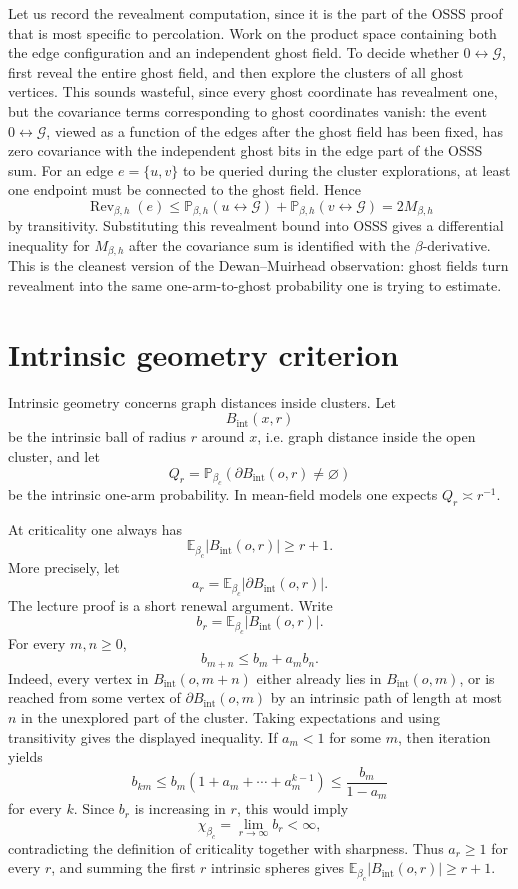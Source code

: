 \documentclass[11pt,reqno]{book}
\numberwithin{equation}{chapter}
\theoremstyle{plain}
\theoremstyle{definition}
\theoremstyle{remark}
\renewcommand{\P}{\mathbb P}
\newcommand{\E}{\mathbb E}
\newcommand{\1}{\mathbf 1}
\newcommand{\as}{\asymp}
\begin{document}
Let us record the revealment computation, since it is the part of the OSSS proof that is most specific to percolation. Work on the product space containing both the edge configuration and an independent ghost field. To decide whether \(0\leftrightarrow \mathcal G\), first reveal the entire ghost field, and then explore the clusters of all ghost vertices. This sounds wasteful, since every ghost coordinate has revealment one, but the covariance terms corresponding to ghost coordinates vanish: the event \(0\leftrightarrow \mathcal G\), viewed as a function of the edges after the ghost field has been fixed, has zero covariance with the independent ghost bits in the edge part of the OSSS sum. For an edge \(e=\{u,v\}\) to be queried during the cluster explorations, at least one endpoint must be connected to the ghost field. Hence
\[
  \operatorname{Rev}_{\beta,h}(e)
  \leq
  \P_{\beta,h}(u\leftrightarrow \mathcal G)
  +
  \P_{\beta,h}(v\leftrightarrow \mathcal G)
  =
  2M_{\beta,h}
\]
by transitivity. Substituting this revealment bound into OSSS gives a differential inequality for \(M_{\beta,h}\) after the covariance sum is identified with the \(\beta\)-derivative. This is the cleanest version of the Dewan--Muirhead observation: ghost fields turn revealment into the same one-arm-to-ghost probability one is trying to estimate.

\section{Intrinsic geometry criterion}

Intrinsic geometry concerns graph distances inside clusters. Let
\[
  B_{\mathrm{int}}(x,r)
\]
be the intrinsic ball of radius $r$ around $x$, i.e. graph distance inside the open cluster, and let
\[
  Q_r=\P_{\beta_c}(\partial B_{\mathrm{int}}(o,r)\neq\varnothing)
\]
be the intrinsic one-arm probability. In mean-field models one expects $Q_r\as r^{-1}$.

At criticality one always has
\[
  \E_{\beta_c}|B_{\mathrm{int}}(o,r)|\geq r+1.
\]
More precisely, let
\[
  a_r=\E_{\beta_c}|\partial B_{\mathrm{int}}(o,r)|.
\]
The lecture proof is a short renewal argument. Write
\[
  b_r=\E_{\beta_c}|B_{\mathrm{int}}(o,r)|.
\]
For every \(m,n\geq0\),
\[
  b_{m+n}\leq b_m+a_m b_n.
\]
Indeed, every vertex in \(B_{\mathrm{int}}(o,m+n)\) either already lies in
\(B_{\mathrm{int}}(o,m)\), or is reached from some vertex of
\(\partial B_{\mathrm{int}}(o,m)\) by an intrinsic path of length at most
\(n\) in the unexplored part of the cluster. Taking expectations and using
transitivity gives the displayed inequality. If \(a_m<1\) for some \(m\),
then iteration yields
\[
  b_{km}\leq b_m(1+a_m+\cdots+a_m^{k-1})
  \leq \frac{b_m}{1-a_m}
\]
for every \(k\). Since \(b_r\) is increasing in \(r\), this would imply
\[
  \chi_{\beta_c}
  =
  \lim_{r\to\infty}b_r
  <
  \infty,
\]
contradicting the definition of criticality together with sharpness. Thus
\(a_r\geq1\) for every \(r\), and summing the first \(r\) intrinsic spheres
gives \(\E_{\beta_c}|B_{\mathrm{int}}(o,r)|\geq r+1\).
\end{document}
